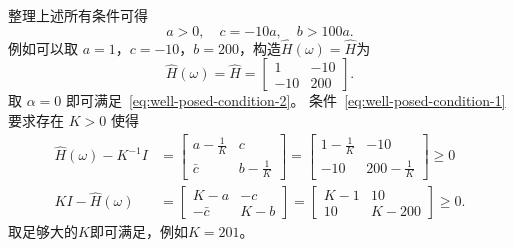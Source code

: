 \begin{solution*}
    整理上述所有条件可得
    \[
        a > 0,\quad c = -10 a,\quad b > 100 a.
    \]
    例如可以取 $a=1$，$c = -10$，$b = 200$，构造$\widehat{H}(\omega)=\widehat{H}$为
    \[
        \widehat{H}(\omega)=\widehat{H}=\begin{bmatrix}
            1   & -10 \\
            -10 & 200
        \end{bmatrix}.
    \]
    取 $\alpha = 0$ 即可满足~\eqref{eq:well-posed-condition-2}。
    条件~\eqref{eq:well-posed-condition-1} 要求存在 $K > 0$ 使得
    \begin{align*}
        \widehat{H}(\omega)-K^{-1}I & =
        \begin{bmatrix}
            a - \frac{1}{K} & c              \\
            \bar{c}         & b -\frac{1}{K}
        \end{bmatrix}
        =
        \begin{bmatrix}
            1 - \frac{1}{K} & -10              \\
            -10             & 200 -\frac{1}{K}
        \end{bmatrix}
        \ge 0
        \\
        K I-\widehat{H}(\omega)     & =
        \begin{bmatrix}
            K - a    & -c  \\
            -\bar{c} & K-b
        \end{bmatrix}
        =
        \begin{bmatrix}
            K - 1 & 10    \\
            10    & K-200
        \end{bmatrix}
        \ge 0.
    \end{align*}
    取足够大的$K$即可满足，例如$K=201$。
\end{solution*}

